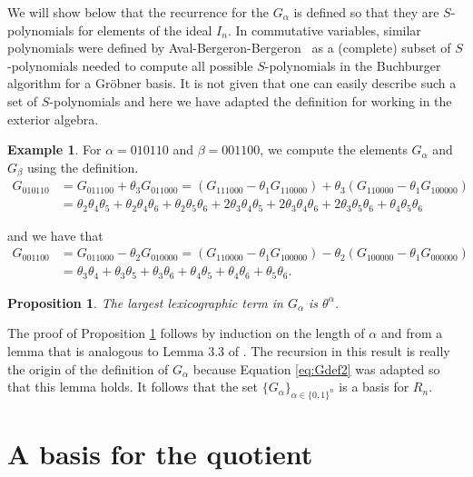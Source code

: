 \documentclass[submission]{FPSAC2023}
\newtheorem{prop}[theorem]{Proposition}
\theoremstyle{definition}
\newtheorem{example}[theorem]{Example}
\numberwithin{equation}{section}
\begin{document}
We will show below that the recurrence for the
$G_\alpha$ is defined so that they are $S$-polynomials \cite{CLO}
for elements of the ideal $I_n$.
In commutative variables, similar polynomials were defined by Aval-Bergeron-Bergeron~\cite{AB,ABB}
as a (complete) subset of $S$-polynomials needed to compute all possible
$S$-polynomials in the Buchburger algorithm for a Gr\"obner basis.
It is not given that one can easily describe such a set of $S$-polynomials and here we have adapted
the definition for working in the exterior algebra.

\begin{example} For $\alpha = 010110$ and $\beta = 001100$, we compute
the elements $G_\alpha$ and $G_\beta$ using the definition.
\begin{align*}
G_{010110} &= G_{011100} + \theta_3 G_{011000} = (G_{111000} - \theta_1 G_{110000})
+ \theta_3(G_{110000} - \theta_1 G_{100000})\\
&= \theta_2 \theta_4 \theta_5 + \theta_2 \theta_4 \theta_6 + \theta_2 \theta_5 \theta_6
+ 2 \theta_3 \theta_4 \theta_5 + 2 \theta_3 \theta_4 \theta_6 + 2 \theta_3 \theta_5 \theta_6
+ \theta_4 \theta_5 \theta_6
\end{align*}

and we have that
\begin{align*}
G_{001100} &= G_{011000} - \theta_2 G_{010000} = (G_{110000} - \theta_1 G_{100000})
- \theta_2 (G_{100000} - \theta_1 G_{000000})\\
&= \theta_3 \theta_4 + \theta_3 \theta_5 + \theta_3 \theta_6 + \theta_4 \theta_5 + \theta_4 \theta_6 + \theta_5 \theta_6.
\end{align*}
\end{example}

\begin{prop}\label{prop:largest}
The largest lexicographic term in $G_\alpha$ is $\theta^\alpha$.
\end{prop}

The proof of Proposition \ref{prop:largest} follows by induction
on the length of $\alpha$ and
from a lemma that is analogous to Lemma 3.3 of \cite{AB}.
The recursion in this result is really the origin of the definition
of $G_\alpha$ because Equation \eqref{eq:Gdef2}
was adapted so that this lemma holds.  It follows that
the set $\{ G_\alpha \}_{\alpha \in \{0,1\}^n}$ is a basis
for $R_n$.


\section{A basis for the quotient}\label{sec:ballotbasis}
\end{document}
